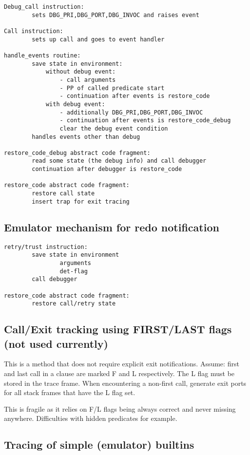 \begin{verbatim}
Debug_call instruction:
        sets DBG_PRI,DBG_PORT,DBG_INVOC and raises event

Call instruction:
        sets up call and goes to event handler

handle_events routine:
        save state in environment:
            without debug event:
                - call arguments
                - PP of called predicate start
                - continuation after events is restore_code
            with debug event:
                - additionally DBG_PRI,DBG_PORT,DBG_INVOC
                - continuation after events is restore_code_debug
                clear the debug event condition
        handles events other than debug

restore_code_debug abstract code fragment:
        read some state (the debug info) and call debugger
        continuation after debugger is restore_code

restore_code abstract code fragment:
        restore call state
        insert trap for exit tracing
\end{verbatim}


\subsection{Emulator mechanism for redo notification}
\begin{verbatim}
retry/trust instruction:
        save state in environment
                arguments
                det-flag
        call debugger

restore_code abstract code fragment:
        restore call/retry state
\end{verbatim}


\subsection{Call/Exit tracking using FIRST/LAST flags (not used currently)}

This is a method that does not require explicit exit notifications.
Assume: first and last call in a clause are marked F and L respectively.
The L flag must be stored in the trace frame.
When encountering a non-first call, generate exit ports for all
stack frames that have the L flag set.

This is fragile as it relies on F/L flags being always correct and
never missing anywhere. Difficulties with hidden predicates for example.


\subsection{Tracing of simple (emulator) builtins}

